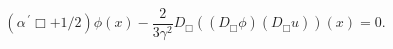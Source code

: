 \begin{equation}
\label{seom-t} \left(\alpha^{\,\prime}\Box+1/2\right)\phi(x)
-\frac{2}{3\gamma^2}D_\Box\left((D_\Box \phi) (D_\Box
u)\right)(x)=0.
\end{equation}

